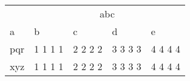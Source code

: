 \documentclass[a4paper,11pt]{article}
\begin{document}
 
\begin{center}
\begin{tabular}{m{5mm}|p{2.5mm}|p{2.5mm}|p{2.5mm}|p{2.5mm}} \hline
  &  &\multicolumn{2}{c|}{abc}  & \\ \cline{3-4}
 a& b & c & d &  e \\ \hline
 pqr & 1 1 1 1 & 2 2 2 2 & 3 3 3 3 & 4 4 4 4 \\ \hline
 xyz & 1 1 1 1 & 2 2 2 2 & 3 3 3 3 & 4 4 4 4 \\ \hline
\end{tabular}
\end{center}
 
\end{document}
